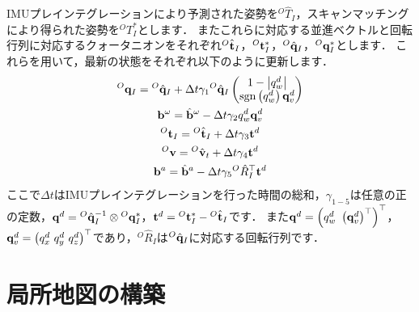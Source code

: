 IMUプレインテグレーションにより予測された姿勢を${}^{O}\hat{T}_{I}$，スキャンマッチングにより得られた姿勢を${}^{O}T_{I}^{*}$とします．
またこれらに対応する並進ベクトルと回転行列に対応するクォータニオンをそれぞれ${}^{O}\hat{ {\bf t} }_{I}$，${}^{O}{\bf t}_{I}^{*}$，${}^{O}\hat{ {\bf q} }_{I}$，${}^{O}{\bf q}_{I}^{*}$とします．
これらを用いて，最新の状態をそれぞれ以下のように更新します．
%
\begin{align}
  \begin{gathered}
    {}^{O}{\bf q}_{I} = {}^{O}\hat{ {\bf q} }_{I} + \Delta t \gamma_{1} {}^{O}\hat{ {\bf q} }_{I} \left( \begin{matrix} 1 - \left| q_{w}^{d} \right| \\ {\rm sgn} \left( q_{w}^{d} \right) {\bf q}_{v}^{d} \end{matrix} \right) \\
    {\bf b}^{\omega} = \hat{ {\bf b} }^{\omega} - \Delta t \gamma_{2} q_{w}^{d} {\bf q}_{v}^{d} \\
    {}^{O}{\bf t}_{I} = {}^{O}\hat{ {\bf t} }_{I} + \Delta t \gamma_{3} {\bf t}^{d} \\
    {}^{O}{\bf v} = {}^{O}\hat{ {\bf v} }_{t} + \Delta t \gamma_{4} {\bf t}^{d} \\
    {\bf b}^{a} = \hat{ {\bf b} }^{a} - \Delta t \gamma_{5} {}^{O}\hat{R}_{I}^{\top} {\bf t}^{d}
  \end{gathered}
\end{align}
%
ここで$\Delta t$はIMUプレインテグレーションを行った時間の総和，$\gamma_{1-5}$は任意の正の定数，${\bf q}^{d} = {}^{O}\hat{ {\bf q} }_{I}^{-1} \otimes {}^{O}{\bf q}_{I}^{*}$，${\bf t}^{d} = {}^{O}{\bf t}_{I}^{*} - {}^{O}\hat{ {\bf t} }_{I}$です．
また${\bf q}^{d} = \left( q_{w}^{d} ~ \left( {\bf q}_{v}^{d} \right)^{\top} \right)^{\top}$，${\bf q}_{v}^{d} = \left( q_{x}^{d} ~ q_{y}^{d} ~ q_{z}^{d} \right)^{\top}$であり，${}^{O}\hat{R}_{I}$は${}^{O}\hat{ {\bf q} }_{I}$に対応する回転行列です．



















\section{局所地図の構築}
\label{subsec:local_map_building}

